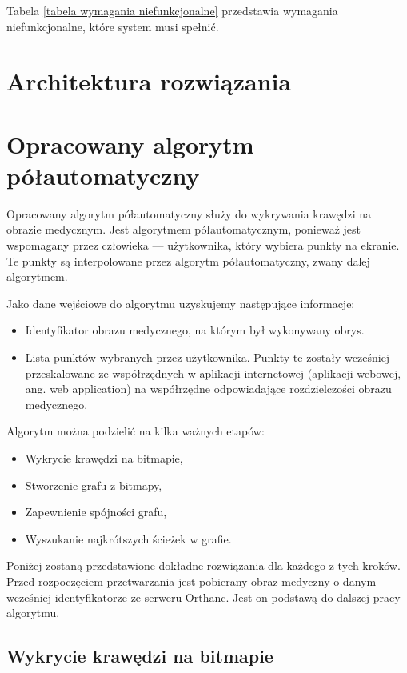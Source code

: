 \documentclass[a4paper,11pt,twoside]{report}
\theoremstyle{definition}
\begin{document}
Tabela \ref{tabela wymagania niefunkcjonalne} przedstawia wymagania niefunkcjonalne, które system musi spełnić.

\section {Architektura rozwiązania}

\section {Opracowany algorytm półautomatyczny}

Opracowany algorytm półautomatyczny służy do wykrywania krawędzi na obrazie medycznym. Jest algorytmem półautomatycznym, ponieważ jest wspomagany przez człowieka --- użytkownika, który wybiera punkty na ekranie. Te punkty są interpolowane przez algorytm półautomatyczny, zwany dalej algorytmem.

Jako dane wejściowe do algorytmu uzyskujemy następujące informacje:
\begin{itemize}[noitemsep]
\item {Identyfikator obrazu medycznego, na którym był wykonywany obrys.}
\item {Lista punktów wybranych przez użytkownika. Punkty te zostały wcześniej przeskalowane ze współrzędnych w aplikacji internetowej (aplikacji webowej, ang. web application) na współrzędne odpowiadające rozdzielczości obrazu medycznego.}
\end{itemize}


Algorytm można podzielić na kilka ważnych etapów:

\begin{itemize}[noitemsep]
\item {Wykrycie krawędzi na bitmapie,}
\item {Stworzenie grafu z bitmapy,}
\item {Zapewnienie spójności grafu,}
\item {Wyszukanie najkrótszych ścieżek w grafie.}
\end{itemize}

Poniżej zostaną przedstawione dokładne rozwiązania dla każdego z tych kroków. Przed rozpoczęciem przetwarzania jest pobierany obraz medyczny o danym wcześniej identyfikatorze ze serweru Orthanc. Jest on podstawą do dalszej pracy algorytmu.


\subsection {Wykrycie krawędzi na bitmapie}
\end{document}
